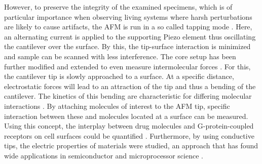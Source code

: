 \documentclass{article}
\begin{document}
However, to preserve the integrity of the examined specimens, which is of particular importance when observing living systems where harsh perturbations are likely to cause artifacts, the AFM is run in a so called tapping mode \cite{binnig1986atomic}. Here, an alternating current is applied to the supporting Piezo element thus oscillating the cantilever over the surface. By this, the tip-surface interaction is minimized and sample can be scanned with less interference.  
The core setup has been further modified and extended to even measure intermolecular forces \cite{hinterdorfer2006detection}. For this, the cantilever tip is slowly approached to a surface. At a specific distance, electrostatic forces will lead to an attraction of the tip and thus a bending of the cantilever. The kinetics of this bending are characteristic for differing molecular interactions \cite{cappella1999force}. By attaching molecules of interest to the AFM tip, specific interaction between these and molecules located at a surface can be measured. Using this concept, the interplay between drug molecules and G-protein-coupled receptors on cell surfaces could be quantified \cite{radmacher1997measuring}. Furthermore, by using conductive tips, the electric properties of materials were studied, an approach that has found wide applications in semiconductor and microprocessor science \cite{lang2004conducting}. 

\end{document}
